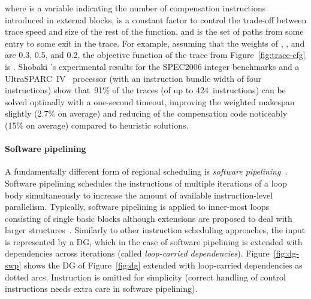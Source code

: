 \documentclass[acmsmall,authorversion,nonacm]{acmart}
\begin{document}
where  is a variable indicating the number of compensation
instructions introduced in external blocks,  is a constant factor
to control the trade-off between trace speed and size of the rest of
the function, and  is the set of paths from some entry to some exit
in the trace.
For example, assuming that the weights of , , and  are
0.3, 0.5, and 0.2, the objective function of the trace from
Figure~\ref{fig:trace-cfg} is .
Shobaki \etal{}'s experimental results for the SPEC2006 integer
benchmarks and a UltraSPARC~IV~\cite{Greenley1995} processor (with an
instruction bundle width of four instructions) show that~91\% of the
traces (of up to 424~instructions) can be solved optimally with a
one-second timeout, improving the weighted makespan slightly (2.7\% on
average) and reducing of the compensation code noticeably (15\% on
average) compared to heuristic solutions.

\paragraph{Software pipelining}

A fundamentally different form of regional scheduling is
\emph{software pipelining}~\cite{Rau1981,Lam1988}.
Software pipelining schedules the instructions of multiple iterations
of a loop body simultaneously to increase the amount of available
instruction-level parallelism.
Typically, software pipelining is applied to inner-most loops
consisting of single basic blocks although extensions are proposed to
deal with larger structures~\cite[Section 20.4]{Rong2007}.
Similarly to other instruction scheduling approaches, the input is
represented by a DG, which in the case of software pipelining is
extended with dependencies across iterations (called
\emph{loop-carried dependencies}).
Figure~\ref{fig:dg-swp} shows the DG of Figure~\ref{fig:dg} extended
with loop-carried dependencies as dotted arcs.
Instruction  is omitted for simplicity (correct handling
of control instructions needs extra care in software pipelining).
\end{document}
